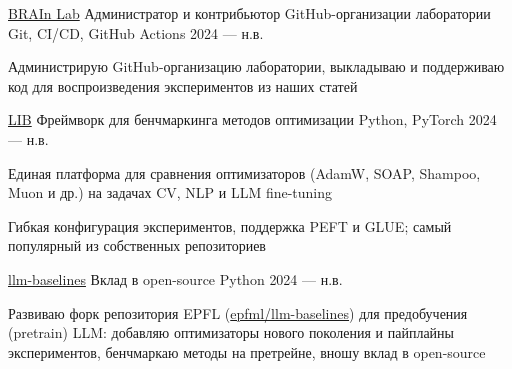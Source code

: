 
\begin{cventries}

  \cventry
    {\href{https://github.com/brain-lab-research}{BRAIn Lab}} %
    {Администратор и контрибьютор GitHub-организации лаборатории} %
    {Git, CI/CD, GitHub Actions} %
    {2024 — н.в.} %
    {
      \begin{cvitems}
        \item {Администрирую GitHub-организацию лаборатории, выкладываю и поддерживаю код для воспроизведения экспериментов из наших статей}
      \end{cvitems}
    }

  \cventry
    {\href{https://github.com/Vepricov/LIB}{LIB}} %
    {Фреймворк для бенчмаркинга методов оптимизации} %
    {Python, PyTorch} %
    {2024 — н.в.} %
    {
      \begin{cvitems}
        \item {Единая платформа для сравнения оптимизаторов (AdamW, SOAP, Shampoo, Muon и др.) на задачах CV, NLP и LLM fine-tuning}
        \item {Гибкая конфигурация экспериментов, поддержка PEFT и GLUE; самый популярный из собственных репозиториев}
      \end{cvitems}
    }

  \cventry
    {\href{https://github.com/Vepricov/llm-baselines}{llm-baselines}} %
    {Вклад в open-source} %
    {Python} %
    {2024 — н.в.} %
    {
      \begin{cvitems}
        \item {Развиваю форк репозитория EPFL (\href{https://github.com/epfml/llm-baselines}{epfml/llm-baselines}) для предобучения (pretrain) LLM: добавляю оптимизаторы нового поколения и пайплайны экспериментов, бенчмаркаю методы на претрейне, вношу вклад в open-source}
      \end{cvitems}
    }


\end{cventries}
